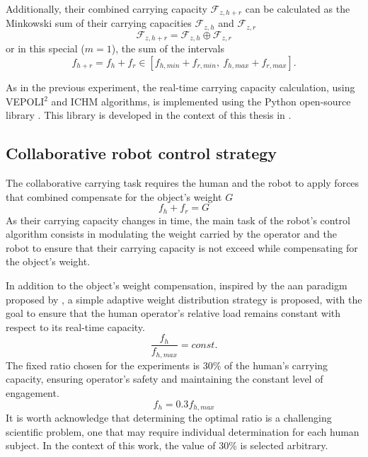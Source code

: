 Additionally, their combined carrying capacity $\mathcal{F}_{z,h+r}$ can be calculated as the Minkowski sum of their carrying capacities $\mathcal{F}_{z,h}$ and $\mathcal{F}_{z,r}$ 
$$\mathcal{F}_{z,h+r} = \mathcal{F}_{z,h}\oplus \mathcal{F}_{z,r}$$
or in this special ($m=1$), the sum of the intervals 
$$f_{h+r} = f_{h}+f_{r} \in  [f_{h,min} + f_{r,min}, ~f_{h,max} + f_{r,max}].$$

As in the previous experiment, the real-time carrying capacity calculation, using VEPOLI$^2$ and ICHM algorithms, is implemented using the Python open-source library . This library is developed in the context of this thesis in .

\subsection{Collaborative robot control strategy}
\label{sec:collab_robot_control_human_robot}

The collaborative carrying task requires the human and the robot to apply forces that combined compensate for the object's weight $G$ 
$$f_{h} + f_{r} = G$$
As their carrying capacity changes in time, the main task of the robot's control algorithm consists in modulating the weight carried by the operator and the robot to ensure that their carrying capacity is not exceed while compensating for the object's weight.

In addition to the object's weight compensation, inspired by the \gls{aan} paradigm proposed by 
\citet{carmichael2013admittance}, a simple adaptive weight distribution strategy is proposed, with the goal to ensure that the human operator's relative load remains constant with respect to its real-time capacity. 
$$\frac{f_h}{f_{h,max}} = const.$$
The fixed ratio chosen for the experiments is 30\% of the human's carrying capacity, ensuring operator's safety and maintaining the constant level of engagement.  
$$
f_h = 0.3 f_{h,max}
$$ 
It is worth acknowledge that determining the optimal ratio is a challenging scientific problem, one that may require individual determination for each human subject. In the context of this work, the value of 30\% is selected arbitrary.

